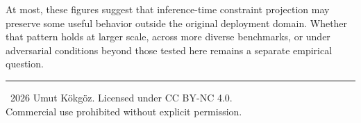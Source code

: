 \documentclass[11pt,a4paper]{article}
\begin{document}
\begin{table}[h]
\centering
\caption{Exploratory cross-domain diagnostic probe ($N=50$ per subset). Results are descriptive of the specific samples tested and should not be interpreted as robust cross-domain validation or as general benchmark performance. Observed values are reported under our experimental setup only.}
\label{tab:generalization}
\end{table}

At most, these figures suggest that inference-time constraint projection may preserve some useful behavior outside the original deployment domain. Whether that pattern holds at larger scale, across more diverse benchmarks, or under adversarial conditions beyond those tested here remains a separate empirical question.




\vfill
\noindent\rule{\textwidth}{0.4pt}
\begin{center}
\small\textcopyright~2026 Umut K\"{o}kg\"{o}z. Licensed under CC BY-NC 4.0.\\
Commercial use prohibited without explicit permission.
\end{center}
\end{document}
